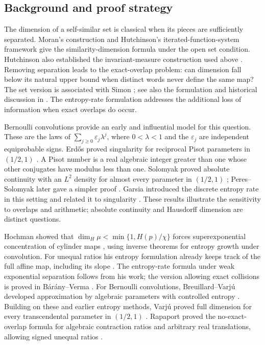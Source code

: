 \subsection{Background and proof strategy}

The dimension of a self-similar set is classical when its pieces are
sufficiently separated.  Moran's construction \cite{Moran1946} and
Hutchinson's iterated-function-system framework \cite{Hutchinson1981}
give the similarity-dimension formula under the open set condition.
Hutchinson also established the invariant-measure construction used
above \cite[Theorem~4.4(1)]{Hutchinson1981}.
Removing separation leads to the exact-overlap problem: can dimension
fall below its natural upper bound when distinct words never define
the same map?  The set version is associated with Simon
\cite{Simon1996}; see also the formulation and historical discussion
in \cite[Section~1]{VarjuSurvey2026}.
The entropy-rate formulation addresses the additional loss of
information when exact overlaps do occur.

Bernoulli convolutions provide an early and influential model for this
question.  These are the laws of $\sum_{j\ge0}\varepsilon_j\lambda^j$,
where $0<\lambda<1$ and the $\varepsilon_j$ are independent
equiprobable signs.
Erd\H{o}s proved singularity for reciprocal Pisot parameters
in $(1/2,1)$ \cite{Erdos1939}.  A Pisot number is a real algebraic
integer greater than one whose other conjugates have modulus less
than one.  Solomyak proved absolute continuity with an
$L^2$ density for almost every parameter in $(1/2,1)$
\cite{Solomyak1995}; Peres--Solomyak later gave a simpler proof
\cite{PeresSolomyak1996}.
Garsia introduced the discrete entropy rate in this setting and
related it to singularity \cite[Theorem~1.2]{Garsia1963}.
These results illustrate the sensitivity to overlaps and arithmetic;
absolute continuity and Hausdorff dimension are distinct questions.

Hochman showed that $\dim_H\mu<\min\{1,H(p)/\chi\}$
forces superexponential concentration of cylinder maps
\cite[Theorem~1.1]{Hochman2014}, using inverse theorems for entropy
growth under convolution.  For unequal ratios his entropy formulation
already keeps track of the full affine map, including its slope
\cite[Theorem~1.4]{Hochman2014}.
The entropy-rate formula under weak exponential separation follows
from his work; the version allowing exact collisions is proved in
B\'ar\'any--Verma \cite[Theorem~3.5]{BaranyVerma2026}.
For Bernoulli convolutions, Breuillard--Varj\'u developed approximation
by algebraic parameters with controlled entropy
\cite{BreuillardVarju2019}.  Building on these and earlier entropy
methods, Varj\'u proved full dimension for every transcendental parameter
in $(1/2,1)$ \cite[Theorem~3]{VarjuTranscendental2019}.
Rapaport proved the no-exact-overlap formula for algebraic
contraction ratios and arbitrary real translations, allowing signed
unequal ratios \cite[Theorem~2]{Rapaport2022}.

